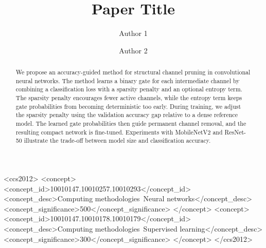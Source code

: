 \documentclass[sigplan,screen]{acmart}
\begin{document}
\title{Paper Title}

\author{Author 1}

\author{Author 2}
\correspondingauthor
{}

\renewcommand{\shortauthors}{Author1 et al.}

\begin{abstract}
We propose an accuracy-guided method for structural channel pruning in convolutional neural networks. The method learns a binary gate for each intermediate channel by combining a classification loss with a sparsity penalty and an optional entropy term. The sparsity penalty encourages fewer active channels, while the entropy term keeps gate probabilities from becoming deterministic too early. During training, we adjust the sparsity penalty using the validation accuracy gap relative to a dense reference model. The learned gate probabilities then guide permanent channel removal, and the resulting compact network is fine-tuned. Experiments with MobileNetV2 and ResNet-50 illustrate the trade-off between model size and classification accuracy.
\end{abstract}

\begin{CCSXML}
<ccs2012>
<concept>
<concept_id>10010147.10010257.10010293</concept_id>
<concept_desc>Computing methodologies~Neural networks</concept_desc>
<concept_significance>500</concept_significance>
</concept>
<concept>
<concept_id>10010147.10010178.10010179</concept_id>
<concept_desc>Computing methodologies~Supervised learning</concept_desc>
<concept_significance>300</concept_significance>
</concept>
</ccs2012>
\end{CCSXML}




\maketitle
\end{document}
